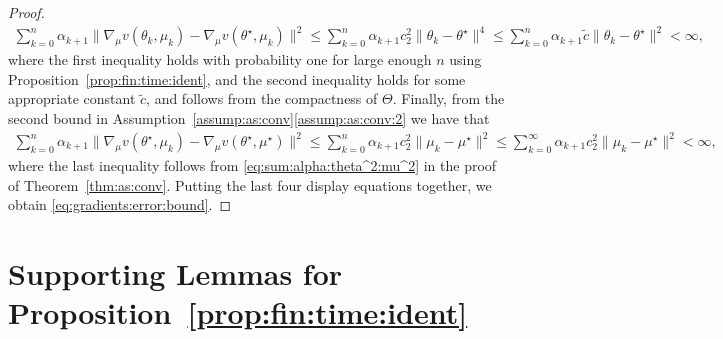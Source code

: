 \documentclass[11pt,a4paper]{article}
\theoremstyle{definition}
\begin{document}
\begin{proof}
\begin{align*}
    \sum_{k=0}^n \alpha_{k+1}\|\nabla_\mu v(\theta_k,\mu_k) -\nabla_\mu v(\theta^\star,\mu_k)\|^2 \leq \sum_{k=0}^n \alpha_{k+1} c_2^2 \|\theta_k - \theta^\star\|^4 \leq \sum_{k=0}^n \alpha_{k+1} \tilde{c} \|\theta_k - \theta^\star\|^2 < \infty,
\end{align*}
where the first inequality holds with probability one for large enough $n$ using Proposition~\ref{prop:fin:time:ident}, and the second inequality holds for some appropriate constant $\tilde{c}$, and follows from the compactness of $\Theta$. Finally, from the second bound in Assumption~\ref{assump:as:conv}\ref{assump:as:conv:2} we have that
\begin{align*}
    \sum_{k=0}^n \alpha_{k+1}\|\nabla_\mu v(\theta^\star,\mu_k) - \nabla_\mu v(\theta^\star,\mu^\star)\|^2 \leq \sum_{k=0}^n \alpha_{k+1} c_2^2 \|\mu_k - \mu^\star\|^2 \leq \sum_{k=0}^\infty \alpha_{k+1} c_2^2 \|\mu_k - \mu^\star\|^2 < \infty,
\end{align*}
where the last inequality follows from \eqref{eq:sum:alpha:theta^2:mu^2} in the proof of Theorem~\ref{thm:as:conv}.
Putting the last four display equations together, we obtain \eqref{eq:gradients:error:bound}.
\end{proof}










\section{Supporting Lemmas for Proposition~\ref{prop:fin:time:ident}}
\label{appendix:proof:fin:time:ident}
\end{document}
